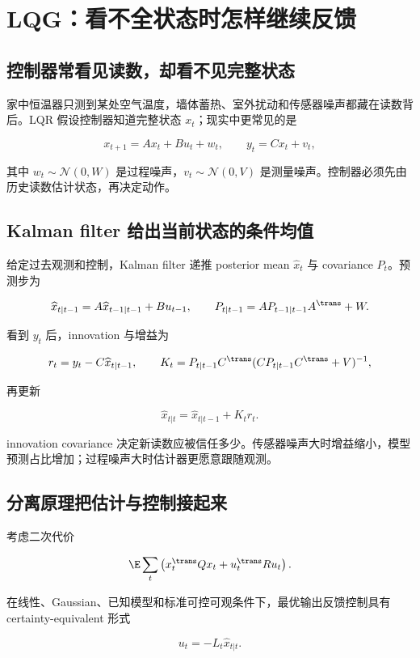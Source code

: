 \section{LQG：看不全状态时怎样继续反馈}
\label{sec:16-Control-and-Reinforcement-Learning/01-Optimal-Control/04}

\subsection{控制器常看见读数，却看不见完整状态}

家中恒温器只测到某处空气温度，墙体蓄热、室外扰动和传感器噪声都藏在读数背后。LQR 假设控制器知道完整状态 \(x_t\)；现实中更常见的是

\[
x_{t+1}=Ax_t+Bu_t+w_t,
\qquad
y_t=Cx_t+v_t,
\]

其中 \(w_t\sim\mathcal N(0,W)\) 是过程噪声，\(v_t\sim\mathcal N(0,V)\) 是测量噪声。控制器必须先由历史读数估计状态，再决定动作。

\subsection{Kalman filter 给出当前状态的条件均值}

给定过去观测和控制，Kalman filter 递推 posterior mean \(\widehat x_t\) 与 covariance \(P_t\)。预测步为

\[
\widehat x_{t|t-1}=A\widehat x_{t-1|t-1}+Bu_{t-1},
\qquad
P_{t|t-1}=AP_{t-1|t-1}A^\trans+W.
\]

看到 \(y_t\) 后，innovation 与增益为

\[
r_t=y_t-C\widehat x_{t|t-1},
\qquad
K_t=P_{t|t-1}C^\trans
(CP_{t|t-1}C^\trans+V)^{-1},
\]

再更新

\[
\widehat x_{t|t}
=\widehat x_{t|t-1}+K_tr_t.
\]

innovation covariance 决定新读数应被信任多少。传感器噪声大时增益缩小，模型预测占比增加；过程噪声大时估计器更愿意跟随观测。

\subsection{分离原理把估计与控制接起来}

考虑二次代价

\[
\E\sum_t
\left(x_t^\trans Qx_t+u_t^\trans Ru_t\right).
\]

在线性、Gaussian、已知模型和标准可控可观条件下，最优输出反馈控制具有 certainty-equivalent 形式

\[
u_t=-L_t\widehat x_{t|t}.
\]

